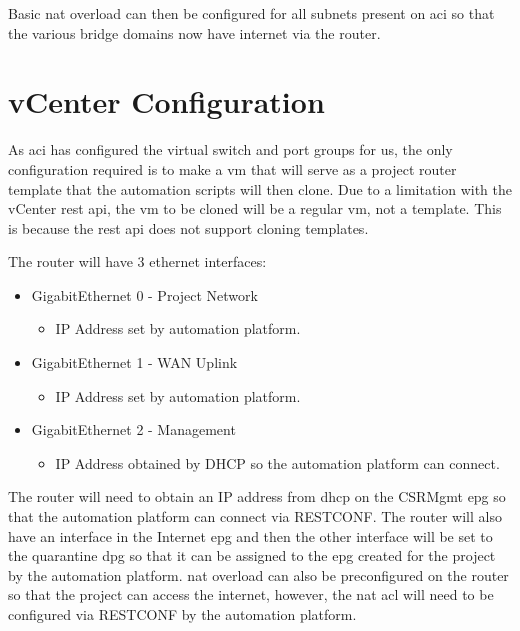 Basic \gls{nat} overload can then be configured for all subnets present on \gls{aci} so that the various bridge domains now have internet via the router.

\section{vCenter Configuration}
As \gls{aci} has configured the virtual switch and port groups for us, the only configuration required is to make a \gls{vm} that will serve as a project router template that the automation scripts will then clone. Due to a limitation with the vCenter \gls{rest} \gls{api}, the \gls{vm} to be cloned will be a regular \gls{vm}, not a template. This is because the \gls{rest} \gls{api} does not support cloning templates.

The router will have 3 ethernet interfaces:
\begin{itemize}
    \item GigabitEthernet 0 - Project Network
          \begin{itemize}
              \item IP Address set by automation platform.
          \end{itemize}
    \item GigabitEthernet 1 - WAN Uplink
          \begin{itemize}
              \item IP Address set by automation platform.
          \end{itemize}
    \item GigabitEthernet 2 - Management
          \begin{itemize}
              \item IP Address obtained by DHCP so the automation platform can connect.
          \end{itemize}
\end{itemize}


The router will need to obtain an IP address from \gls{dhcp} on the CSRMgmt \gls{epg} so that the automation platform can connect via RESTCONF. The router will also have an interface in the Internet \gls{epg} and then the other interface will be set to the quarantine \gls{dpg} so that it can be assigned to the \gls{epg} created for the project by the automation platform. \gls{nat} overload can also be preconfigured on the router so that the project can access the internet, however, the \gls{nat} \gls{acl} will need to be configured via RESTCONF by the automation platform.


